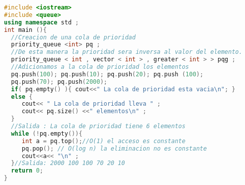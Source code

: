 \begin{lstlisting}[language=C++]
#include <iostream>
#include <queue>
using namespace std ;
int main (){
  //Creacion de una cola de prioridad
  priority_queue <int> pq ;
  //De esta manera la prioridad sera inversa al valor del elemento.
  priority_queue < int , vector < int > , greater < int > > pqg ;
  //Adicionamos a la cola de prioridad los elementos
  pq.push(100); pq.push(10); pq.push(20); pq.push (100);
  pq.push(70); pq.push(2000);
  if( pq.empty() ){ cout<<" La cola de prioridad esta vacia\n"; } 
  else {
     cout<< " La cola de prioridad lleva " ;
     cout<< pq.size() <<" elementos\n" ;
  }
  //Salida : La cola de prioridad tiene 6 elementos
  while (!pq.empty()){
     int a = pq.top();//O(1) el acceso es constante
     pq.pop(); // O(log n) la eliminacion no es constante
     cout<<a<< "\n" ;
  }//Salida: 2000 100 100 70 20 10
  return 0;
}
\end{lstlisting}